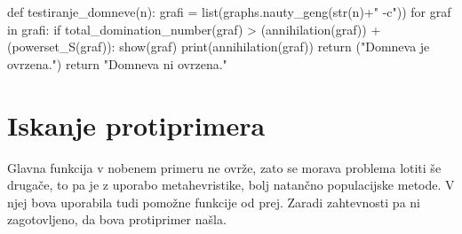 \documentclass[11pt, a4paper]{article}
\begin{document}
\begin{spverbatim}
def testiranje_domneve(n):
    grafi = list(graphs.nauty_geng(str(n)+" -c"))
    for graf in grafi:
        if total_domination_number(graf) > (annihilation(graf)) + (powerset_S(graf)):
            show(graf)
            print(annihilation(graf))
            return ("Domneva je ovrzena.")
    return "Domneva ni ovrzena."
\end{spverbatim}

\section{\textbf{Iskanje protiprimera}}
Glavna funkcija v nobenem primeru ne ovrže, zato se morava problema lotiti še drugače, to pa je z uporabo metahevristike, bolj natančno populacijske metode. V njej bova uporabila tudi pomožne funkcije od prej. Zaradi zahtevnosti pa ni zagotovljeno, da bova protiprimer našla.
\end{document}
